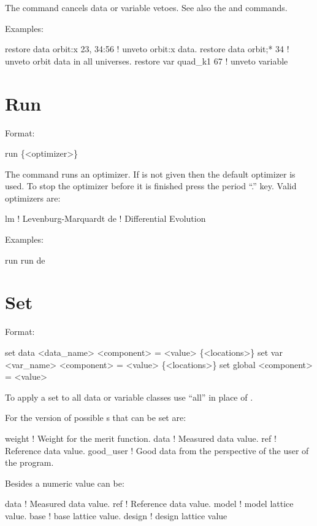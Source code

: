 \vskip 0.2in 
The  command cancels data or variable
vetoes. See also the 
and  commands.

Examples:
\begin{example}
  restore data orbit:x  23, 34:56 ! unveto orbit:x data.
  restore data orbit;* 34         ! unveto orbit data in all universes.
  restore var quad_k1 67          ! unveto variable
\end{example}


\section{Run}
\label{s:run}

Format:
\begin{example}
  run \{<optimizer>\}
\end{example}

\vskip 0.2in 
The  command runs an optimizer. If  is not
given then the default optimizer is used. To stop the optimizer before
it is finished press the period ``.'' key.  Valid optimizers are:
\begin{example}
  lm            ! Levenburg-Marquardt
  de            ! Differential Evolution
\end{example}

Examples:
\begin{example}
  run 
  run de
\end{example}

\section{Set}
\label{s:set}

Format:
\begin{example}
  set data <data_name> <component> = <value> \{<locations>\}
  set var <var_name> <component> = <value> \{<locations>\}
  set global <component> = <value>
\end{example}

\vskip 0.2in
To apply a set to all data or variable classes use ``all''
in place of .

For the  version of  possible 
s that can be set are:
\begin{example}
  weight      ! Weight for the merit function.
  data        ! Measured data value.
  ref         ! Reference data value.
  good_user   ! Good data from the perspective of the user of the \tao program.
\end{example}
Besides a numeric value  can be:
\begin{example}
  data        ! Measured data value.
  ref         ! Reference data value.
  model       ! model lattice value.
  base        ! base lattice value.
  design      ! design lattice value
\end{example}

